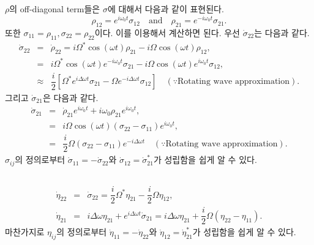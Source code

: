 \documentclass[10pt, a4paper]{article}
\numberwithin{equation}{section}
\begin{document}
    \subsection{}
    $\rho$의 off-diagonal term들은 $\sigma$에 대해서 다음과 같이 표현된다.
    \begin{equation}
        \rho_{12} = e^{i\omega_0 t} \sigma_{12} \quad \text{and} \quad \rho_{21} = e^{-i\omega_0 t}\sigma_{21}.
    \end{equation}
    또한 $\sigma_{11} = \rho_{11}, \sigma_{22} = \rho_{22}$이다. 이를 이용해서 계산하면 된다. 우선 $\dot{\sigma}_{22}$는 다음과 같다.
    \begin{eqnarray}
        \dot{\sigma}_{22} &=& \dot{\rho}_{22} = i\Omega^* \cos(\omega t)\rho_{21} - i\Omega \cos(\omega t) \rho_{12}, \\[1ex]
        &=& i \Omega^* \cos(\omega t) e^{-i\omega_0 t}\sigma_{21} - i\Omega \cos(\omega t) e^{i\omega_0 t} \sigma_{12}, \\[1ex]
        &\approx & \dfrac{i}{2}\left[ \Omega^* e^{i\Delta \omega t}\sigma_{21} - \Omega e^{-i\Delta \omega t}\sigma_{12}\right] \quad (\because \text{Rotating wave approximation}).
    \end{eqnarray}
    그리고 $\dot{\sigma}_{21}$은 다음과 같다.
    \begin{eqnarray}
        \dot{\sigma}_{21} &=& \dot{\rho}_{21}e^{i\omega_0 t} + i\omega_0 \rho_{21}e^{i\omega_0 t}, \\[1ex]
        &=& i\Omega \cos(\omega t) (\sigma_{22} - \sigma_{11})e^{i\omega_0 t},\\[1ex]
        &=& \dfrac{i}{2}\Omega (\sigma_{22} - \sigma_{11})e^{-i\Delta \omega t} \quad (\because \text{Rotating wave approximation}).
    \end{eqnarray}
    $\sigma_{ij}$의 정의로부터 $\dot{\sigma}_{11} = -\dot{\sigma}_{22}$와 $\dot{\sigma}_{12} = \dot{\sigma}_{21}^*$가 성립함을 쉽게 알 수 있다.

    \subsection{}
    \begin{eqnarray}
        \dot{\eta}_{22} &=& \dot{\sigma}_{22} = \dfrac{i}{2}\Omega^* \eta_{21} - \dfrac{i}{2}\Omega \eta_{12}, \\[1ex]
        \dot{\eta}_{21} &=& i\Delta \omega \eta_{21} + e^{i\Delta \omega t}\dot{\sigma}_{21} = i\Delta \omega \eta_{21} + \dfrac{i}{2}\Omega (\eta_{22} - \eta_{11}).
    \end{eqnarray}
    마찬가지로 $\eta_{ij}$의 정의로부터 $\dot{\eta}_{11} = -\dot{\eta}_{22}$와 $\dot{\eta}_{12} = \dot{\eta}_{21}^*$가 성립함을 쉽게 알 수 있다.
\end{document}
